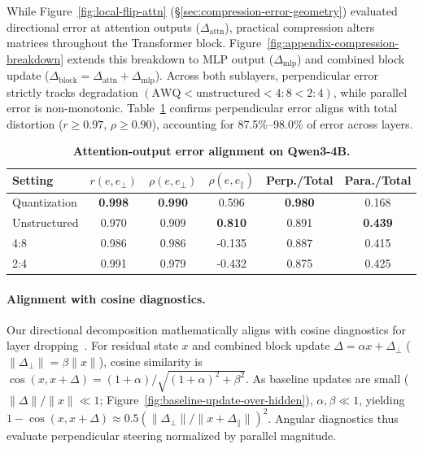While Figure~\ref{fig:local-flip-attn} (\S\ref{sec:compression-error-geometry}) evaluated directional error at attention outputs ($\Delta_{\mathrm{attn}}$), practical compression alters matrices throughout the Transformer block.
Figure~\ref{fig:appendix-compression-breakdown} extends this breakdown to MLP output ($\Delta_{\mathrm{mlp}}$) and combined block update ($\Delta_{\mathrm{block}} = \Delta_{\mathrm{attn}} + \Delta_{\mathrm{mlp}}$).
Across both sublayers, perpendicular error strictly tracks degradation \mbox{$(\text{AWQ} < \text{unstructured} < 4{:}8 < 2{:}4)$}, while parallel error is non-monotonic.
Table~\ref{tab:local-total-perp-alignment} confirms perpendicular error aligns with total distortion ($r \ge 0.97$, $\rho \ge 0.90$), accounting for 87.5\%--98.0\% of error across layers.

\begin{table}[H]
  \vspace{-6pt}
  \centering
  \scriptsize
  \caption{\textbf{Attention-output error alignment on Qwen3-4B.}}
  \label{tab:local-total-perp-alignment}
  \setlength{\tabcolsep}{3.3pt}
  \renewcommand{\arraystretch}{0.85}
  \begin{tabular}{lccccc}
    \toprule
    Setting & \(r(e,e_{\perp})\) & \(\rho(e,e_{\perp})\) &
    \(\rho(e,e_{\parallel})\) & Perp./Total & Para./Total \\
    \midrule
    Quantization & \textbf{0.998} & \textbf{0.990} & 0.596 & \textbf{0.980} & 0.168 \\
    Unstructured & 0.970 & 0.909 & \textbf{0.810} & 0.891 & \textbf{0.439} \\
    4:8 & 0.986 & 0.986 & -0.135 & 0.887 & 0.415 \\
    2:4 & 0.991 & 0.979 & -0.432 & 0.875 & 0.425 \\
    \bottomrule
  \end{tabular}
  \vspace{-6pt}
\end{table}

\paragraph{Alignment with cosine diagnostics.}
Our directional decomposition mathematically aligns with cosine diagnostics for layer dropping~\citep{He2026UncoveringTR}.
For residual state $x$ and combined block update $\Delta = \alpha x + \Delta_\perp$ ($\|\Delta_\perp\|=\beta\|x\|$), cosine similarity is $\cos(x,x+\Delta) = (1+\alpha)/\sqrt{(1+\alpha)^2+\beta^2}$.
As baseline updates are small ($\|\Delta\|/\|x\| \ll 1$; Figure~\ref{fig:baseline-update-over-hidden}), $\alpha,\beta \ll 1$, yielding $1-\cos(x,x+\Delta) \approx 0.5(\|\Delta_\perp\|/\|x+\Delta_\parallel\|)^2$.
Angular diagnostics thus evaluate perpendicular steering normalized by parallel magnitude.
